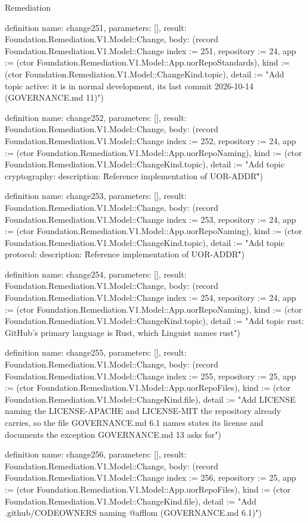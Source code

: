 \begin{lexlean}{Remediation}
\begin{semanticmodule}
definition{
  name: change251,
  parameters: [],
  result: Foundation.Remediation.V1.Model::Change,
  body: (record Foundation.Remediation.V1.Model::Change {index := 251, repository := 24, app := (ctor Foundation.Remediation.V1.Model::App.uorRepoStandards), kind := (ctor Foundation.Remediation.V1.Model::ChangeKind.topic), detail := "Add topic active: it is in normal development, its last commit 2026-10-14 (GOVERNANCE.md 11)"})
}

definition{
  name: change252,
  parameters: [],
  result: Foundation.Remediation.V1.Model::Change,
  body: (record Foundation.Remediation.V1.Model::Change {index := 252, repository := 24, app := (ctor Foundation.Remediation.V1.Model::App.uorRepoNaming), kind := (ctor Foundation.Remediation.V1.Model::ChangeKind.topic), detail := "Add topic cryptography: description: \"Reference implementation of UOR-ADDR\""})
}

definition{
  name: change253,
  parameters: [],
  result: Foundation.Remediation.V1.Model::Change,
  body: (record Foundation.Remediation.V1.Model::Change {index := 253, repository := 24, app := (ctor Foundation.Remediation.V1.Model::App.uorRepoNaming), kind := (ctor Foundation.Remediation.V1.Model::ChangeKind.topic), detail := "Add topic protocol: description: \"Reference implementation of UOR-ADDR\""})
}

definition{
  name: change254,
  parameters: [],
  result: Foundation.Remediation.V1.Model::Change,
  body: (record Foundation.Remediation.V1.Model::Change {index := 254, repository := 24, app := (ctor Foundation.Remediation.V1.Model::App.uorRepoNaming), kind := (ctor Foundation.Remediation.V1.Model::ChangeKind.topic), detail := "Add topic rust: GitHub's primary language is Rust, which Linguist names rust"})
}

definition{
  name: change255,
  parameters: [],
  result: Foundation.Remediation.V1.Model::Change,
  body: (record Foundation.Remediation.V1.Model::Change {index := 255, repository := 25, app := (ctor Foundation.Remediation.V1.Model::App.uorRepoFiles), kind := (ctor Foundation.Remediation.V1.Model::ChangeKind.file), detail := "Add LICENSE naming the LICENSE-APACHE and LICENSE-MIT the repository already carries, so the file GOVERNANCE.md 6.1 names states its license and documents the exception GOVERNANCE.md 13 asks for"})
}

definition{
  name: change256,
  parameters: [],
  result: Foundation.Remediation.V1.Model::Change,
  body: (record Foundation.Remediation.V1.Model::Change {index := 256, repository := 25, app := (ctor Foundation.Remediation.V1.Model::App.uorRepoFiles), kind := (ctor Foundation.Remediation.V1.Model::ChangeKind.file), detail := "Add .github/CODEOWNERS naming @afflom (GOVERNANCE.md 6.1)"})
}


\end{semanticmodule}
\end{lexlean}
